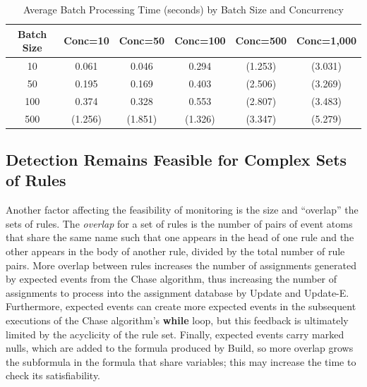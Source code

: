 \begin{table}[htbp]
    \centering
    \begin{footnotesize}
  \begin{tabular}{|c|c|c|c|c|c|}
  \hline
  \textbf{Batch Size} & \textbf{Conc=10} & \textbf{Conc=50} & \textbf{Conc=100}  & \textbf{Conc=500}  & \textbf{Conc=1,000} \\\hline\hline
  10                  & 0.061            & 0.046            & 0.294              & (1.253)              & (3.031)               \\\hline
  50                  & 0.195            & 0.169            & 0.403              & (2.506)              & (3.269)               \\\hline
  100                 & 0.374            & 0.328            & 0.553              & (2.807)              & (3.483)               \\\hline
  500                 & (1.256)          & (1.851)          & (1.326)            & (3.347)              & (5.279)               \\\hline
  \hline
  \end{tabular}
\end{footnotesize}
  \caption{Average Batch Processing Time (seconds) by Batch Size and Concurrency}
  \label{tab:experiment-log-properties}
\end{table}

\subsection{Detection Remains Feasible for Complex Sets of Rules}
\label{subsec:rule-properties}

Another factor affecting the feasibility of monitoring
is the size and ``overlap'' the sets of rules.
The {\em overlap} for a set of rules
is the number of pairs of event atoms
that share the same name
such that one appears in the head of one rule
and the other appears in the body of another rule,
divided by the total number of rule pairs.
More overlap between rules increases the number of assignments
generated by expected events from the {\sf Chase} algorithm,
thus increasing the number of assignments to process into
the assignment database by {\sf Update} and {\sf Update-E}.
Furthermore,
expected events can create more expected events
in the subsequent executions of the {\sf Chase} algorithm's
{\bf while} loop,
but this feedback is ultimately limited by the acyclicity
of the rule set.
Finally,
expected events carry marked nulls,
which are added to the formula produced by {\sf Build},
so more overlap grows the subformula in the formula
that share variables;
this may increase the time to check its satisfiability.

